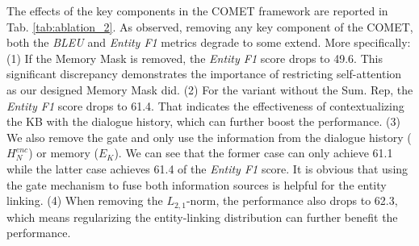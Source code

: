 \documentclass[11pt]{article}
\begin{document}
The effects of the key components in the COMET framework are reported in Tab. \ref{tab:ablation_2}. As observed, removing any key component of the COMET, both the \textit{BLEU} and \textit{Entity F1} metrics degrade to some extend. More specifically: 
(1) If the Memory Mask is removed, the \textit{Entity F1} score drops to 49.6. This significant discrepancy demonstrates the importance of restricting self-attention as our designed Memory Mask did.
(2) For the variant without the Sum. Rep, the \textit{Entity F1} score drops to 61.4. That indicates the effectiveness of contextualizing the KB with the dialogue history, which can further boost the performance.
(3) We also remove the gate and only use the information from the dialogue history ($H_N^{enc}$) or memory ($E_K$). We can see that the former case can only achieve 61.1 while the latter case achieves 61.4 of the \textit{Entity F1} score. It is obvious that using the gate mechanism to fuse both information sources is helpful for the entity linking.  
(4) When removing the $L_{2,1}$-norm, the performance also drops to 62.3, which means regularizing the entity-linking distribution can further benefit the performance.


\begin{table}[htb]
\centering
{}
\caption{The performance of replacing the context-aware memory with Triplet, Row-Ent and Graph representations in COMET. Note that in the second row, we also report the result of a variant which only considers the KB context and ignores the dialogue context.}
\label{tab:transformer+x}
\end{table}
\end{document}
